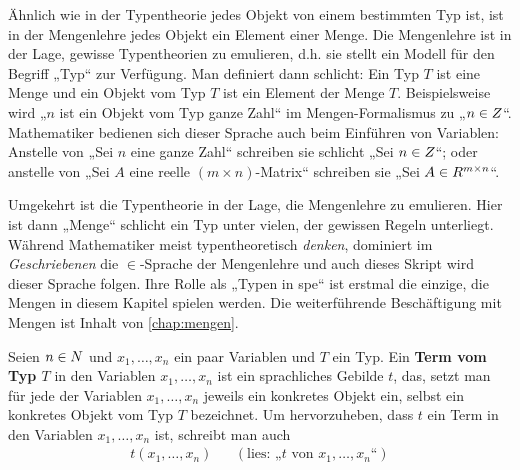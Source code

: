 \begin{bem}
    Ähnlich wie in der Typentheorie jedes Objekt von einem bestimmten Typ ist, ist in der Mengenlehre jedes Objekt ein Element einer Menge. Die Mengenlehre ist in der Lage, gewisse Typentheorien zu emulieren, d.h. sie stellt ein Modell für den Begriff „Typ“ zur Verfügung. Man definiert dann schlicht: Ein Typ $T$ ist eine Menge und ein Objekt vom Typ $T$ ist ein Element der Menge $T$. Beispielsweise wird „$n$ ist ein Objekt vom Typ ganze Zahl“ im Mengen-Formalismus zu „$n\in\relax Z$“. Mathematiker bedienen sich dieser Sprache auch beim Einführen von Variablen: Anstelle von „Sei $n$ eine ganze Zahl“ schreiben sie schlicht „Sei $n\in \relax Z$“; oder anstelle von „Sei $A$ eine reelle $(m\times n)$-Matrix“ schreiben sie „Sei $A\in \relax R^{m\times n}$“.

    Umgekehrt ist die Typentheorie in der Lage, die Mengenlehre zu emulieren. Hier ist dann „Menge“ schlicht ein Typ unter vielen, der gewissen Regeln unterliegt. Während Mathematiker meist typentheoretisch \emph{denken}, dominiert im \emph{Geschriebenen} die $\in$-Sprache der Mengenlehre und auch dieses Skript wird dieser Sprache folgen. Ihre Rolle als „Typen in spe“ ist erstmal die einzige, die Mengen in diesem Kapitel spielen werden. Die weiterführende Beschäftigung mit Mengen ist Inhalt von \cref{chap:mengen}.
\end{bem}


\begin{defin}[Term] \label{def:term} 
    Seien $n\in \relax N$ und $x_1,\dots , x_n$ ein paar Variablen und $T$ ein Typ. Ein \textbf{Term vom Typ $T$} in den Variablen $x_1,\dots , x_n$ ist ein sprachliches Gebilde $t$, das, setzt man für jede der Variablen $x_1,\dots ,x_n$ jeweils ein konkretes Objekt ein, selbst ein konkretes Objekt vom Typ $T$ bezeichnet. Um hervorzuheben, dass $t$ ein Term in den Variablen $x_1,\dots , x_n$ ist, schreibt man auch
    \begin{align*}
        t(x_1,\dots , x_n) && (\text{lies: „$t$ von $x_1,\dots , x_n$“})
    \end{align*}

\end{defin}


